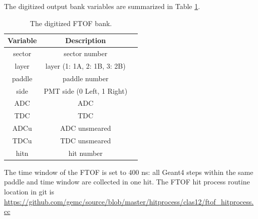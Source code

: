 The digitized output bank variables are summarized in Table \ref{tab:ftofBank}.

\begin{table}[h]
	\begin{center}
		\begin{tabular}{| c | c | c |}
			\hline \hline
			Variable  & Description                                 \\
			\hline
              sector  &                             sector number   \\
               layer  &               layer (1: 1A, 2: 1B, 3: 2B)   \\
              paddle  &                             paddle number   \\
                side  &                PMT side (0 Left, 1 Right)   \\
                 ADC  &                                       ADC   \\
                 TDC  &                                       TDC   \\
                ADCu  &                             ADC unsmeared   \\
                TDCu  &                             TDC unsmeared   \\
                hitn  &                                hit number   \\
			\hline \hline
		\end{tabular}
	\end{center}
	\caption{The digitized FTOF bank.}\label{tab:ftofBank}
\end{table}


The time window  of the FTOF is set to 400 ns: all Geant4 steps within the same paddle and time window are collected in one hit.
The FTOF hit process routine location in git is \url{https://github.com/gemc/source/blob/master/hitprocess/clas12/ftof_hitprocess.cc}



